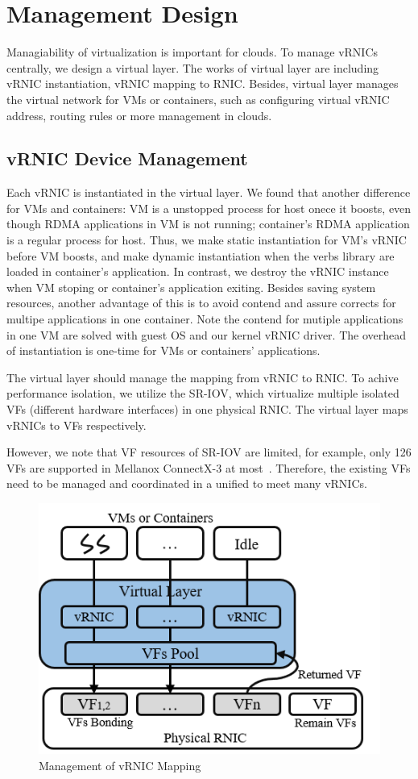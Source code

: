 \section{Management Design}
Managiability of virtualization is important for clouds. To manage vRNICs centrally, we design a virtual layer. The works of virtual layer are including vRNIC instantiation, vRNIC mapping to RNIC. Besides, virtual layer manages the virtual network for VMs or containers, such as configuring virtual vRNIC address, routing rules or more management in clouds.

\subsection{vRNIC Device Management}
Each vRNIC is instantiated in the virtual layer. We found that another difference for VMs and containers: VM is a unstopped process for host onece it boosts, even though RDMA applications in VM is not running; container's RDMA application is a regular process for host. Thus, we make static instantiation for VM's vRNIC before VM boosts, and make dynamic instantiation when the verbs library are loaded in container's application. In contrast, we destroy the vRNIC instance when VM stoping or container's application exiting. Besides saving system resources, another advantage of this is to avoid contend and assure corrects for multipe applications in one container. Note the contend for mutiple applications in one VM are solved with guest OS and our kernel vRNIC driver. The overhead of instantiation is one-time for VMs or containers' applications.

The virtual layer should manage the mapping from vRNIC to RNIC. To achive performance isolation, we utilize the SR-IOV, which virtualize multiple isolated VFs (different hardware interfaces) in one physical RNIC. The virtual layer maps vRNICs to VFs respectively. 

However, we note that VF resources of SR-IOV are limited, for example, only 126 VFs are supported in Mellanox ConnectX-3 at most~\cite{ofed-manual}. Therefore, the existing VFs need to be managed and coordinated in a unified to meet many vRNICs.

\begin{figure}[!ht]
	\centering
	\includegraphics[width=0.9\linewidth]{images/vf-mapping}
	\caption{Management of vRNIC Mapping}
	\label{fig:vf-mapping}
\end{figure}

